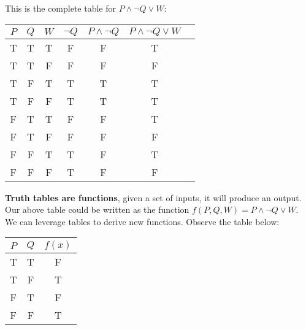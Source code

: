 \newpage

\noindent
This is the complete table for $P \land \neg Q \lor W$:
\begin{center}
    \begin{tabular}{|c|c|c|c|c|c|c|}
        \hline
        \rowcolor{OliveGreen!10}
        $P$ & $Q$ & $W$ & $\neg Q$ & $P \land \neg Q$ & $P \land \neg Q \lor W$ \\
        \hline
        T   & T   & T   & F        & F                & T                       \\
        T   & T   & F   & F        & F                & F                       \\
        T   & F   & T   & T        & T                & T                       \\
        T   & F   & F   & T        & T                & T                       \\
        F   & T   & T   & F        & F                & T                       \\
        F   & T   & F   & F        & F                & F                       \\
        F   & F   & T   & T        & F                & T                       \\
        F   & F   & F   & T        & F                & F                       \\
        \hline
    \end{tabular}
\end{center}
\noindent
\textbf{Truth tables are functions}, given a set of inputs, it will produce an output. Our
above table could be written as the function $f(P, Q, W) = P \land \neg Q \lor W$.\\

\noindent
We can leverage tables to derive new functions. Observe the table below:\\

\begin{center}
    \begin{tabular}{|c|c|c|}
        \hline
        \rowcolor{OliveGreen!10}
        $P$ & $Q$ & $f(x)$ \\
        \hline
        T   & T   & F      \\
        \rowcolor{purple!10}
        T   & F   & T      \\
        F   & T   & F      \\
        \rowcolor{purple!10}
        F   & F   & T      \\
        \hline
    \end{tabular}
\end{center}

